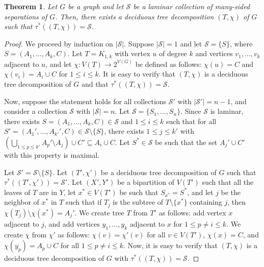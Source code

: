 \documentclass[12pt]{amsart}
\renewcommand{\S}{\mathcal{S}}
\newtheorem{theorem}{Theorem}
\begin{document}
\begin{theorem}
\label{thm:S-to-TD}
Let $G$ be a graph and let $\S$ be a laminar collection of many-sided separations of $G$. Then, there exists a deciduous tree decomposition $(T, \chi)$ of $G$ such that $\tau^*((T, \chi)) = \S$. 
\end{theorem}
\begin{proof}
We proceed by induction on $|\S|$. Suppose $|\S| = 1$ and let $\S = \{S\}$, where $S = (A_1, \hdots, A_k, C)$. Let $T = K_{1, k}$ with vertex $u$ of degree $k$ and vertices $v_1, \hdots, v_k$ adjacent to $u$, and let $\chi: V(T) \to 2^{V(G)}$ be defined as follows: $\chi(u) = C$ and $\chi(v_i) = A_i \cup C$ for $1 \leq i \leq k$. It is easy to verify that $(T, \chi)$ is a deciduous tree decomposition of $G$ and that $\tau^*((T, \chi)) = \S$. 

Now, suppose the statement holds for all collections $\S'$ with $|\S'| = n-1$, and consider a collection $\S$ with $|\S| = n$. Let $\S = \{S_1, \hdots, S_n\}$. Since $\S$ is laminar, there exists $S = (A_1, \hdots, A_k, C) \in \S$ and $1 \leq i \leq k$ such that for all $S' = (A_1', \hdots, A_{k'}', C
) \in \S \setminus \{S\}$, there exists $1 \leq j \leq k'$ with $\left(\bigcup_{1 \leq p \leq k'} A_p' \setminus A_j \right) \cup C' \subseteq A_i \cup C$. Let $S^* \in \S$ be such that the set $A_j' \cup C'$ with this property is maximal. 


Let $\S' = \S \setminus \{S\}$. Let $(T', \chi')$ be a deciduous tree decomposition of $G$ such that $\tau^*((T', \chi')) = \S'$. Let $(X', Y')$ be a bipartition of $V(T')$ such that all the leaves of $T$ are in $Y$, let $x^* \in V(T')$ be such that $S_{x^*} = S^*$, and let $j$ be the neighbor of $x^*$ in $T$ such that if $T_j$ is the subtree of $T \setminus \{x^*\}$ containing $j$, then $\chi(T_j) \setminus \chi(x^*) = A_j'$. We create tree $T$ from $T'$ as follows: add vertex $x$ adjacent to $j$, and add vertices $y_1, \hdots, y_k$ adjacent to $x$ for $1 \leq p \neq i \leq k$. We create $\chi$ from $\chi'$ as follows: $\chi(v) = \chi'(v)$ for all $v \in V(T')$, $\chi(x) = C$, and $\chi(y_p) = A_p \cup C$ for all $1 \leq p \neq i \leq k$. Now, it is easy to verify that $(T, \chi)$ is a deciduous tree decomposition of $G$ with $\tau^*((T, \chi)) = \S$. 
\end{proof}
\end{document}
